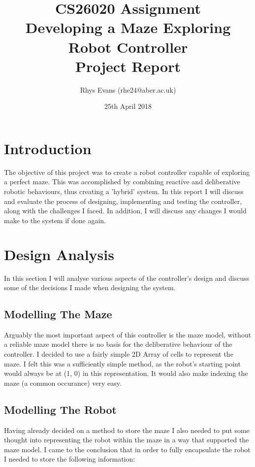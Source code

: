 \documentclass[a4paper]{article}
\begin{document}
	\title{CS26020 Assignment \\ Developing a Maze Exploring Robot Controller \\ Project Report}
	\author{Rhys Evans (rhe24@aber.ac.uk)}
	\date{25th April 2018}
	\maketitle
	\newpage
	\tableofcontents
	\newpage
	
	\section{Introduction}
	The objective of this project was to create a robot controller capable of exploring a perfect maze. This was accomplished by combining reactive and deliberative robotic behaviours, thus creating a 'hybrid' system. In this report I will discuss and evaluate the process of designing, implementing and testing the controller, along with the challenges I faced. In addition, I will discuss any changes I would make to the system if done again.
	
	\section{Design Analysis}
	In this section I will analyse various aspects of the controller's design and discuss some of the decisions I made when designing the system.
	
	\subsection{Modelling The Maze}
	Arguably the most important aspect of this controller is the maze model, without a reliable maze model there is no basis for the deliberative behaviour of the controller. I decided to use a fairly simple 2D Array of cells to represent the maze. I felt this was a sufficiently simple method, as the robot's starting point would always be at (1, 0) in this representation. It would also make indexing the maze (a common occurance) very easy.
	
	\subsection{Modelling The Robot}
	Having already decided on a method to store the maze I also needed to put some thought into representing the robot within the maze in a way that supported the maze model. I came to the conclusion that in order to fully encapsulate the robot I needed to store the following information:\\
	
\end{document}
